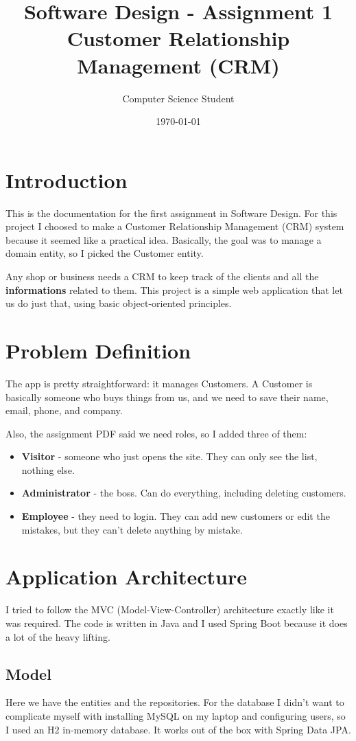 \documentclass[12pt,a4paper]{article}
\title{\textbf{Software Design - Assignment 1\\Customer Relationship Management (CRM)}}
\author{Computer Science Student}
\date{\today}
\begin{document}
\maketitle
\newpage

\tableofcontents
\newpage

\section{Introduction}
This is the documentation for the first assignment in Software Design. For this project I choosed to make a Customer Relationship Management (CRM) system because it seemed like a practical idea. Basically, the goal was to manage a domain entity, so I picked the Customer entity.

Any shop or business needs a CRM to keep track of the clients and all the \textbf{informations} related to them. This project is a simple web application that let us do just that, using basic object-oriented principles.

\section{Problem Definition}
The app is pretty straightforward: it manages Customers. A Customer is basically someone who buys things from us, and we need to save their name, email, phone, and company.

Also, the assignment PDF said we need roles, so I added three of them:
\begin{itemize}
    \item \textbf{Visitor} - someone who just opens the site. They can only see the list, nothing else.
    \item \textbf{Administrator} - the boss. Can do everything, including deleting customers.
    \item \textbf{Employee} - they need to login. They can add new customers or edit the mistakes, but they can't delete anything by mistake.
\end{itemize}

\section{Application Architecture}
I tried to follow the MVC (Model-View-Controller) architecture exactly like it was required. The code is written in Java and I used Spring Boot because it does a lot of the heavy lifting.

\subsection{Model}
Here we have the entities and the repositories. For the database I didn't want to complicate myself with installing MySQL on my laptop and configuring users, so I used an H2 in-memory database. It works out of the box with Spring Data JPA.
\end{document}
